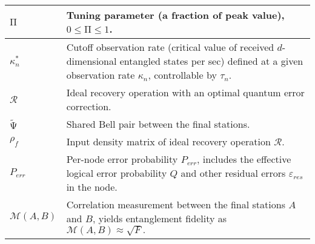 \documentclass[11pt]{article}%
\begin{document}
\begin{longtable}{|p{1.6in}|p{2.8in}|}
$\mathrm{\Pi }$ & Tuning parameter (a fraction of peak value), $\mathrm{0}\mathrm{\le }\mathrm{\Pi }\mathrm{\le }\mathrm{1}$. \\ \hline 
${\kappa }^{\mathrm{*}}_n$ & Cutoff observation rate (critical value of received $d$-dimensional entangled states per sec) defined at a given observation rate ${\kappa }_n$, controllable by ${\tau }_n$. \\ \hline 
$\mathcal{R}$ & Ideal recovery operation with an optimal quantum error correction. \\ \hline 
$\widetilde{\mathrm{\Psi }}$ & Shared Bell pair between the final stations. \\ \hline 
${\rho }_f$ & Input density matrix of ideal recovery operation $\mathcal{R}$. \\ \hline 
$P_{err}$ & Per-node error probability $P_{err}$, includes the effective logical error probability $Q$ and other residual errors ${\varepsilon }_{res}$ in the node. \\ \hline 
$\mathcal{M}\left(A,B\right)$ & Correlation measurement between the final stations $A$ and $B$, yields entanglement fidelity as $\mathcal{M}\left(A,B\right)\mathrm{\approx }\sqrt{F}.$ \\ \hline 
\end{longtable}
\end{document}

